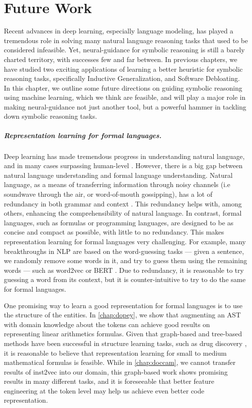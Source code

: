 \chapter{Future Work}
\label{chap:future}
Recent advances in deep learning, especially language modeling, has played a tremendous role in solving many natural language reasoning tasks that used to be considered infeasible. Yet, neural-guidance for symbolic reasoning is still a barely charted territory, with successes few and far between.
In previous chapters, we have studied two exciting applications of learning a better heuristic for symbolic reasoning tasks, specifically Inductive Generalization, and Software Debloating.
In this chapter, we outline some future directions on guiding symbolic reasoning using machine learning, which we think are feasible, and will play a major role in making neural-guidance not just another tool, but a powerful hammer in tackling down symbolic reasoning tasks.

\paragraph{Representation learning for formal languages.} Deep learning has made tremendous progress in understanding natural language, and in many cases surpassing human-level \cite{whosaidwhat, whosaidwhat2}. However, there is a big gap between natural language understanding and formal language understanding. Natural language, as a means of transferring information through noisy channels (i.e soundwave through the air, or word-of-mouth gossipping), has a lot of redundancy in both grammar and context \cite{ling_redundancy}. This redundancy helps with, among others, enhancing the comprehensibility of natural language. In contrast, formal languages, such as formulas or programming languages, are designed to be as concise and compact as possible, with little to no redundancy. This makes representation learning for formal languages very challenging. For example, many breakthroughs in NLP are based on the word-guessing tasks --- given a sentence, we randomly remove some words in it, and try to guess them using the remaining words --- such as word2vec \cite{word2vec} or BERT \cite{bert}. Due to redundancy, it is reasonable to try guessing a word from its context, but it is counter-intuitive to try to do the same for formal languages. 

One promising way to learn a good representation for formal languages is to use the structure of the entities. In \cref{chap:dopey}, we show that augmenting an AST with domain knowledge about the tokens can achieve good results on representing linear arithmetics formulas. Given that graph-based and tree-based methods have been successful in structure learning tasks, such as drug discovery \cite{drug_dis}, it is reasonable to believe that representation learning for small to medium mathematical formulas is feasible. While in \cref{chap:doccam}, we cannot transfer results of inst2vec \cite{inst2vec} into our domain, this graph-based work shows promising results in many different tasks, and it is foreseeable that better feature engineering at the token level may help us achieve even better code representation.

